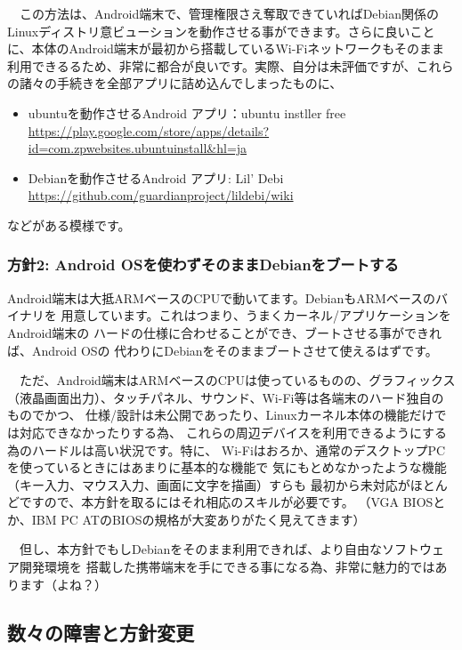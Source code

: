 \documentclass[mingoth,a4paper]{jsarticle}
\begin{document}
　この方法は、Android端末で、管理権限さえ奪取できていればDebian関係のLinuxディストリ意ビューションを動作させる事ができます。さらに良いことに、本体のAndroid端末が最初から搭載しているWi-Fiネットワークもそのまま利用できるるため、非常に都合が良いです。実際、自分は未評価ですが、これらの諸々の手続きを全部アプリに詰め込んでしまったものに、
\begin{itemize}
\item ubuntuを動作させるAndroid アプリ：ubuntu instller free \url{https://play.google.com/store/apps/details?id=com.zpwebsites.ubuntuinstall&hl=ja}
\item Debianを動作させるAndroid アプリ: Lil' Debi \url{https://github.com/guardianproject/lildebi/wiki}
\end{itemize}
などがある模様です。

\subsubsection{方針2: Android OSを使わずそのままDebianをブートする}

 Android端末は大抵ARMベースのCPUで動いてます。DebianもARMベースのバイナリを
用意しています。これはつまり、うまくカーネル/アプリケーションをAndroid端末の
ハードの仕様に合わせることができ、ブートさせる事ができれば、Android OSの
代わりにDebianをそのままブートさせて使えるはずです。

　ただ、Android端末はARMベースのCPUは使っているものの、グラフィックス
（液晶画面出力）、タッチパネル、サウンド、Wi-Fi等は各端末のハード独自のものでかつ、
仕様/設計は未公開であったり、Linuxカーネル本体の機能だけでは対応できなかったりする為、
これらの周辺デバイスを利用できるようにする為のハードルは高い状況です。特に、
Wi-Fiはおろか、通常のデスクトップPCを使っているときにはあまりに基本的な機能で
気にもとめなかったような機能（キー入力、マウス入力、画面に文字を描画）すらも
最初から未対応がほとんどですので、本方針を取るにはそれ相応のスキルが必要です。
（VGA BIOSとか、IBM PC ATのBIOSの規格が大変ありがたく見えてきます）

　但し、本方針でもしDebianをそのまま利用できれば、より自由なソフトウェア開発環境を
搭載した携帯端末を手にできる事になる為、非常に魅力的ではあります（よね？）

\subsection{数々の障害と方針変更}
\end{document}
